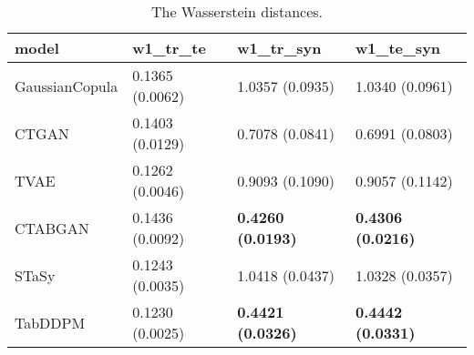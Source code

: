 \begin{table}[h!t]
\vspace{-5mm}
\caption{The Wasserstein distances.}
\label{tab:similarity}
\begin{adjustbox}{width=0.7\textwidth, center} 

\begin{tabular}{|l|l|l|l|}
\hline
model          & w1\_tr\_te      & w1\_tr\_syn              & w1\_te\_syn              \\ \hline
GaussianCopula & 0.1365 (0.0062) & 1.0357 (0.0935)          & 1.0340 (0.0961)          \\ \hline
CTGAN          & 0.1403 (0.0129) & 0.7078 (0.0841)          & 0.6991 (0.0803)          \\ \hline
TVAE           & 0.1262 (0.0046) & 0.9093 (0.1090)          & 0.9057 (0.1142)          \\ \hline
CTABGAN        & 0.1436 (0.0092) & \textbf{0.4260 (0.0193)} & \textbf{0.4306 (0.0216)} \\ \hline
STaSy          & 0.1243 (0.0035) & 1.0418 (0.0437)          & 1.0328 (0.0357)          \\ \hline
TabDDPM        & 0.1230 (0.0025) & \textbf{0.4421 (0.0326)} & \textbf{0.4442 (0.0331)} \\ \hline
\end{tabular}

\end{adjustbox}
\vspace{-5mm}
\end{table}